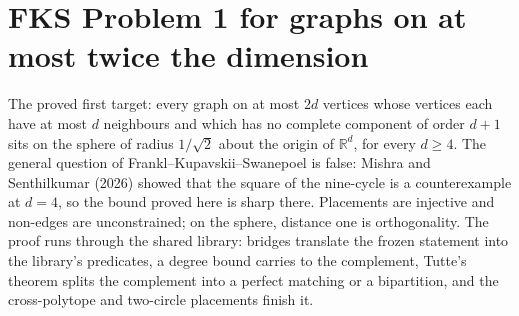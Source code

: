 %
%
%
%

\chapter{FKS Problem 1 for graphs on at most twice the dimension}

The proved first target: every graph on at most $2 d$ vertices whose vertices each have at
most $d$ neighbours and which has no complete component of order $d + 1$ sits on the sphere
of radius $1/\sqrt2$ about the origin of $\mathbb{R}^d$, for every $d \ge 4$. The general
question of Frankl--Kupavskii--Swanepoel is false: Mishra and Senthilkumar (2026) showed
that the square of the nine-cycle is a counterexample at $d = 4$, so the bound proved here
is sharp there. Placements are injective and
non-edges are unconstrained; on the sphere, distance one is orthogonality. The proof runs
through the shared library: bridges translate the frozen statement into the library's
predicates, a degree bound carries to the complement, Tutte's theorem splits the complement
into a perfect matching or a bipartition, and the cross-polytope and two-circle placements
finish it.

